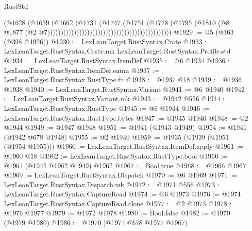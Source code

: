 \begin{lexlean}{RustStd}
\begin{coremodule}
                                                                            (@1628
                                                                              (@1639
                                                                                (@1662
                                                                                  (@1731
                                                                                    (@1747
                                                                                      (@1751
                                                                                        (@1778
                                                                                          (@1795
                                                                                            (@1810
                                                                                              (@8
                                                                                                @1877
                                                                                                (@2
                                                                                                  @7)))))))))))))))))))))))))))))))))))))))))))))))
@1929 := @5 (@363 (@398 @1926))
@1930 := LexLeanTarget.RustSyntax.Crate
@1933 := LexLeanTarget.RustSyntax.Crate.mk LexLeanTarget.RustSyntax.Profile.std
@1934 := LexLeanTarget.RustSyntax.ItemDef
@1935 := @6 @1934
@1936 := LexLeanTarget.RustSyntax.ItemDef.enum
@1937 := LexLeanTarget.RustSyntax.RustType.fn
@1938 := @1937 @18
@1939 := @1936 @1938
@1940 := LexLeanTarget.RustSyntax.Variant
@1941 := @6 @1940
@1942 := LexLeanTarget.RustSyntax.Variant.mk
@1943 := @1942 @556
@1944 := LexLeanTarget.RustSyntax.RustType
@1945 := @6 @1944
@1946 := LexLeanTarget.RustSyntax.RustType.bytes
@1947 := @1945 @1946
@1948 := @2 @1944
@1949 := @1947 @1948
@1951 := @1941 (@1943 @1949)
@1954 := @1941 (@1942 @678 @1948)
@1955 := @2 @1940
@1959 := @1935 (@1939 (@1951 (@1954 @1955)))
@1960 := LexLeanTarget.RustSyntax.ItemDef.apply
@1961 := @1960 @18
@1962 := LexLeanTarget.RustSyntax.RustType.bool
@1966 := @1961 (@1945 @1962 @1949) @1962
@1967 := Bool.true
@1968 := @1966 @1967
@1969 := LexLeanTarget.RustSyntax.Dispatch
@1970 := @6 @1969
@1971 := LexLeanTarget.RustSyntax.Dispatch.mk
@1972 := @1971 @556
@1973 := LexLeanTarget.RustSyntax.CaptureRead
@1974 := @6 @1973
@1976 := @1974 LexLeanTarget.RustSyntax.CaptureRead.clone
@1977 := @2 @1973
@1978 := @1976 @1977
@1979 := @1972 @1978
@1980 := Bool.false
@1982 := @1970 (@1979 @1980)
@1986 := @1970 (@1971 @678 @1977 @1967)

\end{coremodule}
\end{lexlean}

